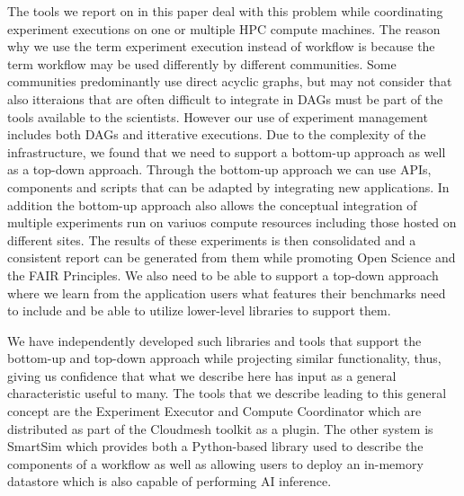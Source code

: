 \documentclass[utf8]{FrontiersinVancouver} %
\begin{document}
The tools we report on in this paper deal with this problem while coordinating experiment executions on one or multiple HPC compute machines. The reason why we use the term experiment execution instead of workflow is because the term workflow may be used differently by different communities. Some communities predominantly use direct acyclic graphs, but may not consider that also itteraions that are often difficult to integrate in DAGs must be part of the tools available to the scientists. However our use of experiment management includes both DAGs and itterative executions. Due to the complexity of the infrastructure, we found that we need to support a bottom-up approach as well as a top-down approach. Through the bottom-up approach we can use APIs, components and scripts that can be adapted by integrating new applications. In addition the bottom-up approach also allows the conceptual integration of multiple experiments run on variuos compute resources including those hosted on different sites. The results of these experiments is then consolidated and a consistent  report can be generated from them while promoting Open Science and the FAIR Principles. We also need to be able to support a top-down approach where we learn from the application users what features their benchmarks need to include and be able to utilize lower-level libraries to support them.

We have independently developed such libraries and tools that support the bottom-up and top-down approach while projecting similar functionality, thus, giving us confidence that what we describe here has input as a general characteristic useful to many. The tools that we describe leading to this general concept are the Experiment Executor and Compute Coordinator which are distributed as part of the Cloudmesh toolkit as a plugin. The other system is SmartSim which provides both a Python-based library used to describe the components of a workflow as well as allowing users to deploy an in-memory datastore which is also capable of performing AI inference. 
\end{document}
